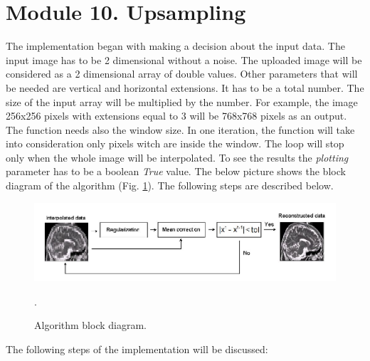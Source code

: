 \section{Module 10. Upsampling}



The implementation began with making a decision about the input data. The input image has to be 2 dimensional without a noise. The uploaded image will be considered as a 2 dimensional array of double values. Other parameters that will be needed are vertical and horizontal extensions. It has to be a total number. The size of the input array will be multiplied by the number. For example, the image 256x256 pixels with extensions equal to 3 will be 768x768 pixels as an output. The function needs also the window size. In one iteration, the function will take into consideration only pixels witch are inside the window. The loop will stop only when the whole image will be interpolated. To see the results the \textit{plotting} parameter has to be a boolean \textit{True} value. 
\newline The below picture shows the block diagram of the algorithm (Fig. \ref{fig: Module10_4}). The following steps are described below.

\begin{figure}[H]
\centering{}\includegraphics[scale=0.5]{figures/Module_10/Module_10_1}\caption{Algorithm block diagram.}. 
\label{fig: Module10_4}
\end{figure}

The following steps of the implementation will be discussed:

